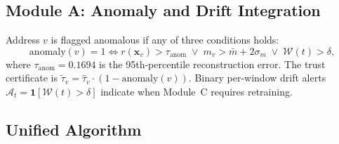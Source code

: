 \documentclass[journal]{IEEEtran}
\begin{document}
\subsection{Module A: Anomaly and Drift Integration}
\label{sec:module_a}

Address $v$ is flagged anomalous if any of three conditions holds:
\begin{equation}
  \mathrm{anomaly}(v) = 1 \iff
    r(\mathbf{x}_v) > \tau_{\mathrm{anom}}
    \;\lor\;
    m_v > \bar{m} + 2\sigma_m
    \;\lor\;
    \mathcal{W}(t) > \delta,
  \label{eq:anomaly_flag}
\end{equation}
where $\tau_{\mathrm{anom}} = 0.1694$ is the 95th-percentile reconstruction
error.
The trust certificate is $\tilde{\tau}_v = \hat{\tau}_v \cdot (1 - \mathrm{anomaly}(v))$.
Binary per-window drift alerts $\mathcal{A}_t = \mathbf{1}[\mathcal{W}(t) > \delta]$
indicate when Module~C requires retraining.

\subsection{Unified Algorithm}
\label{sec:algorithm}
\end{document}
